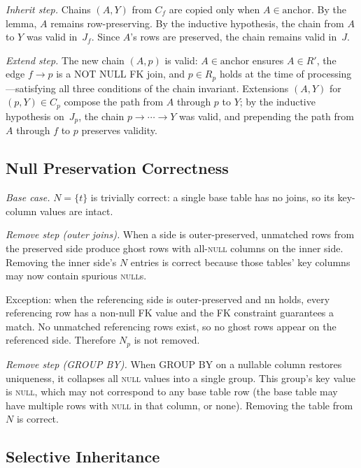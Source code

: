 \documentclass[11pt]{article}
\theoremstyle{definition}
\newcommand{\set}[1]{\{#1\}}
\newcommand{\Rp}{R_p}
\newcommand{\Np}{N_p}
\newcommand{\Cf}{C_f}
\newcommand{\Cp}{C_p}
\newcommand{\Jf}{J_f}
\newcommand{\Jp}{J_p}
\newcommand{\nn}{\mathrm{nn}}
\newcommand{\anchor}{\mathrm{anchor}}
\begin{document}
\noindent
\emph{Inherit step.}\;
Chains $(A, Y)$ from $\Cf$ are copied only when $A \in \anchor$.  By
the lemma, $A$ remains row-preserving.  By the inductive hypothesis,
the chain from $A$ to $Y$ was valid in~$\Jf$.  Since $A$'s rows are
preserved, the chain remains valid in~$J$.

\medskip\noindent
\emph{Extend step.}\;
The new chain $(A, p)$ is valid: $A \in \anchor$ ensures $A \in R'$,
the edge $f \to p$ is a NOT NULL FK join, and $p \in \Rp$ holds at
the time of processing---satisfying all three conditions of the chain
invariant.  Extensions $(A, Y)$ for $(p, Y) \in \Cp$ compose the path
from $A$ through $p$ to $Y$; by the inductive hypothesis on~$\Jp$,
the chain $p \to \cdots \to Y$ was valid, and prepending the path from
$A$ through $f$ to $p$ preserves validity.


\subsection{Null Preservation Correctness}

\emph{Base case.}\;
$N = \set{t}$ is trivially correct: a single base table has no joins,
so its key-column values are intact.

\medskip\noindent
\emph{Remove step (outer joins).}\;
When a side is outer-preserved, unmatched rows from the preserved side
produce ghost rows with all-\textsc{null} columns on the inner side.
Removing the inner side's $N$ entries is correct because those tables'
key columns may now contain spurious \textsc{null}s.

Exception: when the referencing side is outer-preserved and $\nn$
holds, every referencing row has a non-null FK value and the FK
constraint guarantees a match.  No unmatched referencing rows exist,
so no ghost rows appear on the referenced side.  Therefore $\Np$ is
not removed.

\medskip\noindent
\emph{Remove step (GROUP BY).}\;
When GROUP BY on a nullable column restores uniqueness, it collapses
all \textsc{null} values into a single group.  This group's key value
is \textsc{null}, which may not correspond to any base table row (the
base table may have multiple rows with \textsc{null} in that column,
or none).  Removing the table from $N$ is correct.


\subsection{Selective Inheritance}
\end{document}
